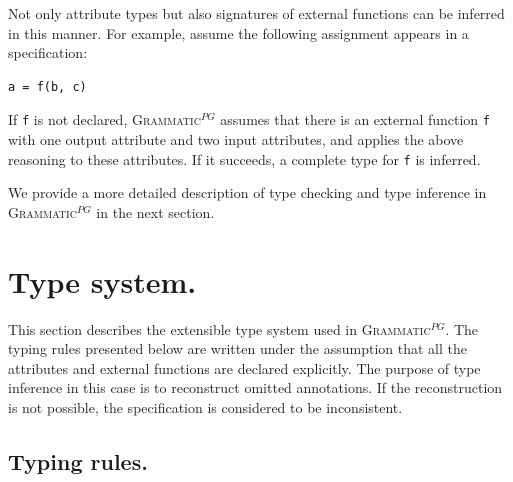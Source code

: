 \documentclass{informat} %
\newcommand{\ATF}{\textsc{Grammatic}$^{PG}$}
\begin{document}
{Not only attribute types but also signatures of external functions can be inferred in this manner. For example, assume the following assignment appears in a specification:
\begin{lstlisting}
a = f(b, c)
\end{lstlisting}
If \texttt{f} is not declared, \ATF{} assumes that there is an external function \texttt{f} with one output attribute and two input attributes, and applies the above reasoning to these attributes. If it succeeds, a complete type for \texttt{f} is inferred.

We provide a more detailed description of type checking and type inference in \ATF{} in the next section.

}

\section{Type system.}\label{TypeSystem}

This section describes the extensible type system used in \ATF{}. The typing rules presented below are written under the assumption that all the attributes and external functions are declared explicitly. The purpose of type inference in this case is to reconstruct omitted annotations. If the reconstruction is not possible, the specification is considered to be inconsistent.

\subsection{Typing rules.}

\newcommand{\G}{ {\mathcal{G}_L} }
\renewcommand{\L}{L}
\newcommand{\eql}{\cong_\L}
\newcommand{\lel}{\le_\L}
\newcommand{\gel}{\ge_\L}
\newcommand{\TUP}{TupleType}
\newcommand{\Str}{String_\L}
\end{document}
